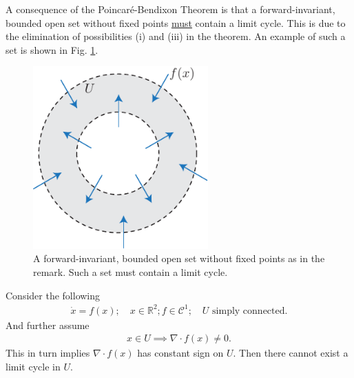 \begin{remark}[]
	A consequence of the Poincaré-Bendixon Theorem is that a forward-invariant, bounded open set without fixed points \underline{must} contain a limit cycle. This is due to the elimination of possibilities (i) and (iii) in the theorem. An example of such a set is shown in Fig. \ref{fig:PB_consequence}.
	\begin{figure}[h!]
		\centering
		\includegraphics[width=0.6\textwidth]{figures/ch4/11PB_consequence.pdf}
		\caption{A forward-invariant, bounded open set without fixed points as in the remark. Such a set must contain a limit cycle.}
		\label{fig:PB_consequence}
	\end{figure}
	
\end{remark}
\begin{proposition}
	Consider the following
	\begin{align}
		\dot{x}	= f(x);\quad x\in \mathbb{R}^{2}; f\in \mathcal{C}^{1};\quad U  \textrm{ simply connected} .
	\end{align}
And further assume 
 \begin{align}
	  x\in U \implies  \nabla \cdot  f(x) \neq 0.
\end{align}
This in turn implies $\nabla \cdot f(x)$ has constant sign on $U$. Then there cannot exist a limit cycle in $U$.
\end{proposition}
